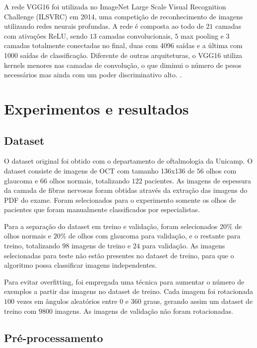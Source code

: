 \documentclass[conference]{IEEEtran}
\begin{document}
  A rede VGG16 foi utilizada no ImageNet Large Scale Visual Recognition Challenge (ILSVRC) em 2014, uma competição de reconhecimento de imagens utilizando redes neurais profundas. A rede é composta ao todo de $21$ camadas com ativações ReLU, sendo $13$ camadas convolucionais, $5$ max pooling e $3$ camadas totalmente conectadas no final, duas com 4096 saídas e a última com 1000 saídas de classificação. Diferente de outras arquiteturas, o VGG16 utiliza kernels menores nas camadas de convolução, o que diminui o número de pesos necessários mas ainda com um poder discriminativo alto. \cite{simonyan2014}.

\section{Experimentos e resultados}

  \subsection{Dataset}


  O dataset original foi obtido com o departamento de oftalmologia da Unicamp. O dataset consiste de imagens de OCT com tamanho 136x136 de $56$ olhos com glaucoma e $66$ olhos normais, totalizando $122$ pacientes. As imagens de espessura da camada de fibras nervosas foram obtidas através da extração das imagens do PDF do exame. Foram selecionados para o experimento somente os olhos de pacientes que foram manualmente classificados por especialistas.

  Para a separação do dataset em treino e validação, foram selecionados $20\%$ de olhos normais e $20\%$ de olhos com glaucoma para validação, e o restante para treino, totalizando $98$ imagens de treino e $24$ para validação. As imagens selecionadas para teste não estão presentes no dataset de treino, para que o algoritmo possa classificar imagens independentes.

  Para evitar overfitting, foi empregada uma técnica para aumentar o número de exemplos a partir das imagens no dataset de treino. Cada imagem foi rotacionada $100$ vezes em ângulos aleatórios entre $0$ e $360$ graus, gerando assim um dataset de treino com $9800$ imagens. As imagens de validação não foram rotacionadas.

  \subsection{Pré-processamento}
\end{document}
